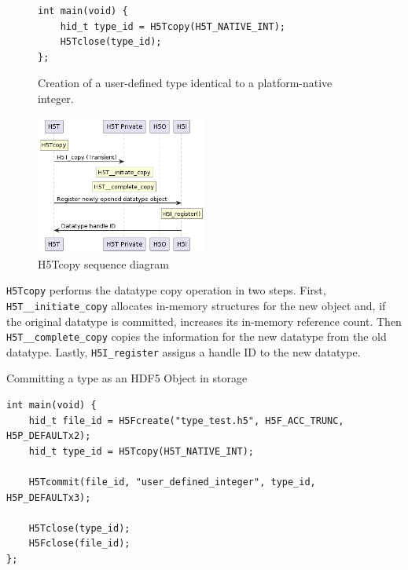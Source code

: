 \begin{figure}
\centering
\caption{Creation of a user-defined type identical to a platform-native integer.}
\label{fig:predefined-type-copy}
\begin{verbatim}
int main(void) {
    hid_t type_id = H5Tcopy(H5T_NATIVE_INT);
    H5Tclose(type_id);
};

\end{verbatim}
\end{figure} 

\begin{figure}
    \centering
    \includegraphics[width=0.5\textwidth]{images/tour_5_uml_datatype_copy.png}
    \caption{H5Tcopy sequence diagram}
    \label{fig:tour-5-uml-datatype-copy}
\end{figure}

\texttt{H5Tcopy} performs the datatype copy operation in two steps. First, \texttt{H5T\_\_initiate\_copy} allocates in-memory structures for the new object and, if the original datatype is committed, increases its in-memory reference count. Then \texttt{H5T\_\_complete\_copy} copies the information for the new datatype from the old datatype. Lastly, \texttt{H5I\_register} assigns a handle ID to the new datatype.

\begin{listing}
\centering
\caption{Committing a type as an HDF5 Object in storage}
\label{lst:type-commit}
\begin{verbatim}
int main(void) {
    hid_t file_id = H5Fcreate("type_test.h5", H5F_ACC_TRUNC, H5P_DEFAULTx2);
    hid_t type_id = H5Tcopy(H5T_NATIVE_INT);
    
    H5Tcommit(file_id, "user_defined_integer", type_id, H5P_DEFAULTx3);

    H5Tclose(type_id);
    H5Fclose(file_id);
};

\end{verbatim}
\end{listing}

